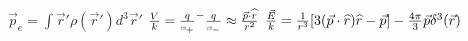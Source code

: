 \documentclass{article}
\def\rcurst{{\mbox{$\resizebox{0.9ex}{0.3em}{\texttt{[image: ScriptRResized]}}$}}}
\begin{document}
\begin{multicols}{2}
$\vec{p}_{ e}   =   \int  \vec{r}'  %
    \rho ( \vec{r}' )d^{3} \vec{r}' $%
    \hfill\textbullet\hfill%
    $\frac{V}{k}  =   %
    \frac{q}{\rcurst_{ +}}   ^{-}   \frac{q}{\rcurst_{ -}}%
      \approx   %
    \frac{\vec{p}\cdot\widehat{r}}{r^{2}}$%
    \hfill\textbullet\hfill%
    $\smash{\frac{\vec{E}}{k}}  =   \frac{1}{r^{ 3}} [ 3 ( \vec{p}%
     \cdot \widehat{r} ) \widehat{r} - \vec{p} ]%
      -  \frac{4 \pi}{3} \vec{p}\delta^{ 3} ( \vec{r})$


\newpage

\end{multicols}
\end{document}
